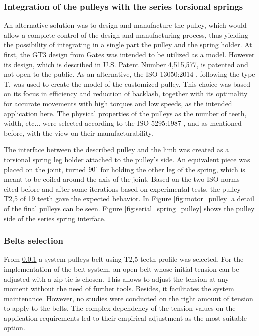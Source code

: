 \subsubsection{Integration of the pulleys with the series torsional springs} %
\label{ssub:integration_with_the_series_rotational}
An alternative solution was to design and manufacture the pulley, which would allow a complete control of the design and manufacturing process, thus yielding the possibility of integrating in a single part the pulley and the spring holder.
At first, the GT3 design from Gates was intended to be utilized as a model.
However its design, which is described in U.S. Patent Number 4,515,577, is patented and not open to the public.
As an alternative, the ISO 13050:2014 \cite{ISO13050}, following the type T, was used to create the model of the customized pulley.
This choice was based on its focus in efficiency and reduction of backlash, together with its optimality for accurate movements with high torques and low speeds, as the intended application here.
The physical properties of the pulleys as the number of teeth, width, etc... were selected according to the ISO 5295:1987 \cite{ISO5295}, and as mentioned before, with the view on their manufacturability.

The interface between the described pulley and the limb was created as a torsional spring leg holder attached to the pulley's side.
An equivalent piece was placed on the joint, turned $90\degree$ for holding the other leg of the spring, which is meant to be coiled around the axis of the joint.
Based on the two ISO norms cited before and after some iterations based on experimental tests, the pulley T2,5 of 19 teeth gave the expected behavior.
In Figure \ref{fig:motor_pulley} a detail of the final pulleys can be seen.
Figure \ref{fig:serial_spring_pulley} shows the pulley side of the series spring interface.

\subsubsection{Belts selection} %
\label{ssub:belts}
From \ref{ssub:integration_with_the_series_rotational} a system pulleys-belt using T2,5 teeth profile was selected.
For the implementation of the belt system, an open belt whose initial tension can be adjusted with a zip-tie is chosen.
This allows to adjust the tension at any moment without the need of further tools.
Besides, it facilitates the system maintenance.
However, no studies were conducted on the right amount of tension to apply to the belts. 
The complex dependency of the tension values on the application requirements led to their empirical adjustment as the most suitable option.

